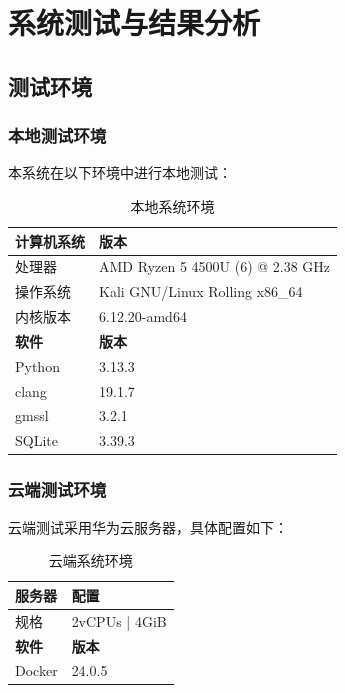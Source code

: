 \chapter{系统测试与结果分析}

\section{测试环境}

\subsection{本地测试环境}

本系统在以下环境中进行本地测试：

\begin{table}[h]
	\centering
	\caption{本地系统环境}
	\begin{tabular}{ll}
		\hline
		\textbf{计算机系统} & \textbf{版本}                      \\
		\hline
		处理器            & AMD Ryzen 5 4500U (6) @ 2.38 GHz \\
		操作系统           & Kali GNU/Linux Rolling x86\_64   \\
		内核版本           & 6.12.20-amd64                    \\
		\hline
		\textbf{软件}    & \textbf{版本}                      \\
		\hline
		Python         & 3.13.3                           \\
		clang          & 19.1.7                           \\
		gmssl          & 3.2.1                            \\
		SQLite         & 3.39.3                           \\
		\hline
	\end{tabular}
\end{table}

\subsection{云端测试环境}

云端测试采用华为云服务器，具体配置如下：

\begin{table}[h]
	\centering
	\caption{云端系统环境}
	\begin{tabular}{ll}
		\hline
		\textbf{服务器} & \textbf{配置}   \\
		\hline
		规格           & 2vCPUs | 4GiB \\
		\hline
		\textbf{软件}  & \textbf{版本}   \\
		\hline
		Docker       & 24.0.5        \\
		\hline
	\end{tabular}
\end{table}

